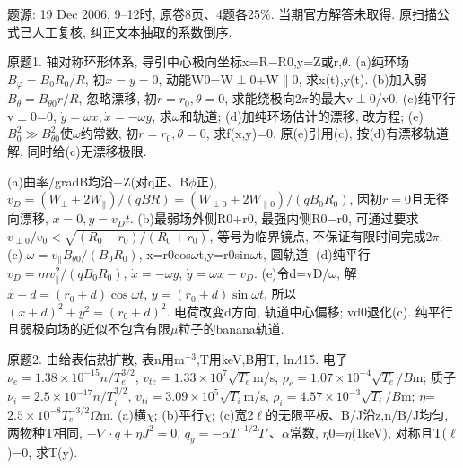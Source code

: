 题源: 19 Dec 2006, 9--12时, 原卷8页、4题各25\%. 当期官方解答未取得. 原扫描公式已人工复核, 纠正文本抽取的系数倒序.
\begin{exercise}\label{ex:06-final-1}
原题1. 轴对称环形体系, 导引中心极向坐标x=R\ensuremath{-}R0,y=Z或r,\ensuremath{\theta}. (a)纯环场 $B_\varphi=B_0R_0/R$, 初$x=y=0$, 动能W0=W\ensuremath{\perp}0+W\ensuremath{\parallel}0, 求x(t),y(t). (b)加入弱 $B_\theta=B_{\theta0}r/R$, 忽略漂移, 初$r=r_0,\theta=0$, 求能绕极向2\ensuremath{\pi}的最大v\ensuremath{\perp}0/v0. (c)纯平行v\ensuremath{\perp}0=0, $\dot y=\omega x,\dot x=-\omega y$, 求\ensuremath{\omega}和轨道; (d)加纯环场估计的漂移, 改方程; (e) $B_0^2\gg B_{\theta0}^2$使\ensuremath{\omega}约常数, 初$r=r_0,\theta=0$, 求f(x,y)=0. 原(e)引用(c), 按(d)有漂移轨道解, 同时给(c)无漂移极限.
\end{exercise}
\begin{solution}
(a)曲率/gradB均沿+Z(对q正、B\ensuremath{\phi}正), $v_D=(W_\perp+2W_\parallel)/(qBR)=(W_{\perp0}+2W_{\parallel0})/(qB_0R_0)$, 因初$r=0$且无径向漂移, $x=0,y=v_Dt$. (b)最弱场外侧R0+r0, 最强内侧R0\ensuremath{-}r0, 可通过要求 $v_{\perp0}/v_0<\sqrt{(R_0-r_0)/(R_0+r_0)}$, 等号为临界镜点, 不保证有限时间完成2\ensuremath{\pi}. (c) $\omega=v_\parallel B_{\theta0}/(B_0R_0)$, x=r0cos\ensuremath{\omega}t,y=r0sin\ensuremath{\omega}t, 圆轨道.
(d)纯平行 $v_D=mv_\parallel^2/(qB_0R_0)$, $\dot x=-\omega y$, $\dot y=\omega x+v_D$. (e)令d=vD/\ensuremath{\omega}, 解 $x+d=(r_0+d)\cos\omega t$, $y=(r_0+d)\sin\omega t$, 所以 $(x+d)^2+y^2=(r_0+d)^2$. 电荷改变d方向, 轨道中心偏移; vd0退化(c). 纯平行且弱极向场的近似不包含有限\ensuremath{\mu}粒子的banana轨道.
\begin{center}\end{center}
\end{solution}
\begin{exercise}\label{ex:06-final-2}
原题2. 由给表估热扩散, 表n用m$^{-3}$,T用keV,B用T, ln\ensuremath{\Lambda}15. 电子 $\nu_e=1.38\times10^{-15}n/T_e^{3/2}$, $v_{te}=1.33\times10^7\sqrt{T_e}$m/s, $\rho_e=1.07\times10^{-4}\sqrt{T_e}/B$m; 质子 $\nu_i=2.5\times10^{-17}n/T_i^{3/2}$, $v_{ti}=3.09\times10^5\sqrt{T_i}$m/s, $\rho_i=4.57\times10^{-3}\sqrt{T_i}/B$m; \ensuremath{\eta}=$2.5\times10^{-8}T_e^{-3/2}$\ensuremath{\Omega}m. (a)横\ensuremath{\chi}; (b)平行\ensuremath{\chi}; (c)宽2\ensuremath{\ell}的无限平板、B/J沿z,n/B/J均匀,两物种T相同, $-\nabla\cdot q+\eta J^2=0$, $q_y=-\alpha T^{-1/2}T'$、\ensuremath{\alpha}常数, \ensuremath{\eta}0=\ensuremath{\eta}(1keV), 对称且T(\ensuremath{\ell})=0, 求T(y).
\end{exercise}
